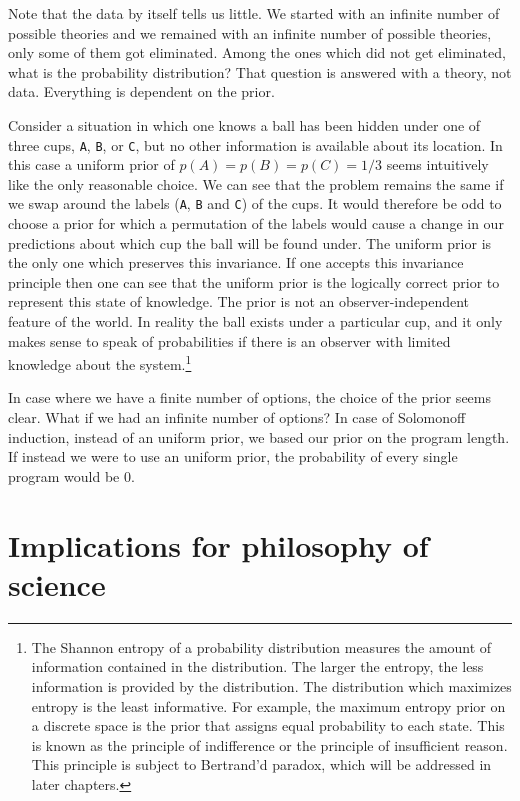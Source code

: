 Note that the data by itself tells us little.
We started with an infinite number of possible theories and we remained with an infinite number of possible theories, only some of them got eliminated.
Among the ones which did not get eliminated, what is the probability distribution?
That question is answered with a theory, not data.
Everything is dependent on the prior.

Consider a situation in which one knows a ball has been hidden under one of three cups, \texttt{A}, \texttt{B}, or \texttt{C}, but no other information is available about its location. 
In this case a uniform prior of $p(A) = p(B) = p(C) = 1/3$ seems intuitively like the only reasonable choice. 
We can see that the problem remains the same if we swap around the labels (\texttt{A}, \texttt{B} and \texttt{C}) of the cups. 
It would therefore be odd to choose a prior for which a permutation of the labels would cause a change in our predictions about which cup the ball will be found under.
The uniform prior is the only one which preserves this invariance. 
If one accepts this invariance principle then one can see that the uniform prior is the logically correct prior to represent this state of knowledge. 
The prior is not an observer-independent feature of the world.
In reality the ball exists under a particular cup, and it only makes sense to speak of probabilities if there is an observer with limited knowledge about the system.\footnote{
The Shannon entropy of a probability distribution measures the amount of information contained in the distribution.
The larger the entropy, the less information is provided by the distribution. 
The distribution which maximizes entropy is the least informative.
For example, the maximum entropy prior on a discrete space is the prior that assigns equal probability to each state.
This is known as the principle of indifference or the principle of insufficient reason.
This principle is subject to Bertrand'd paradox, which will be addressed in later chapters.
}

In case where we have a finite number of options, the choice of the prior seems clear.
What if we had an infinite number of options?
In case of Solomonoff induction, instead of an uniform prior, we based our prior on the program length.
If instead we were to use an uniform prior, the probability of every single program would be 0.

\newpage

\section{Implications for philosophy of science}

